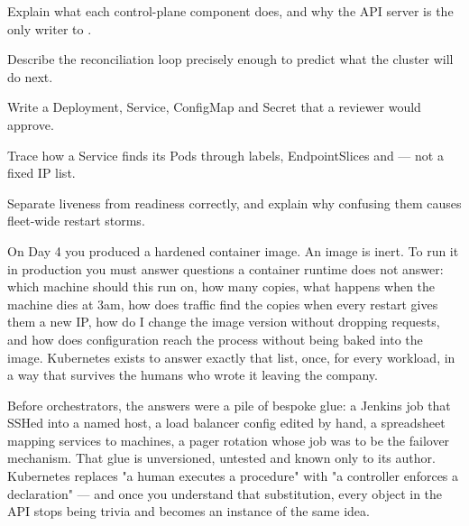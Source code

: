 
\begin{objectives}
\begin{wbitem}
  \item Explain what each control-plane component does, and why the API server is the only writer to .
  \item Describe the reconciliation loop precisely enough to predict what the cluster will do next.
  \item Write a Deployment, Service, ConfigMap and Secret that a reviewer would approve.
  \item Trace how a Service finds its Pods through labels, EndpointSlices and  --- not a fixed IP list.
  \item Separate liveness from readiness correctly, and explain why confusing them causes fleet-wide restart storms.
\end{wbitem}
\end{objectives}


 On Day 4 you produced a hardened container image. An image is inert. To run it in production you must answer questions a container runtime does not answer: which machine should this run on, how many copies, what happens when the machine dies at 3am, how does traffic find the copies when every restart gives them a new IP, how do I change the image version without dropping requests, and how does configuration reach the process without being baked into the image. Kubernetes exists to answer exactly that list, once, for every workload, in a way that survives the humans who wrote it leaving the company.

 Before orchestrators, the answers were a pile of bespoke glue: a Jenkins job that SSHed into a named host, a load balancer config edited by hand, a spreadsheet mapping services to machines, a pager rotation whose job was to be the failover mechanism. That glue is unversioned, untested and known only to its author. Kubernetes replaces "a human executes a procedure" with "a controller enforces a declaration" --- and once you understand that substitution, every object in the API stops being trivia and becomes an instance of the same idea.

